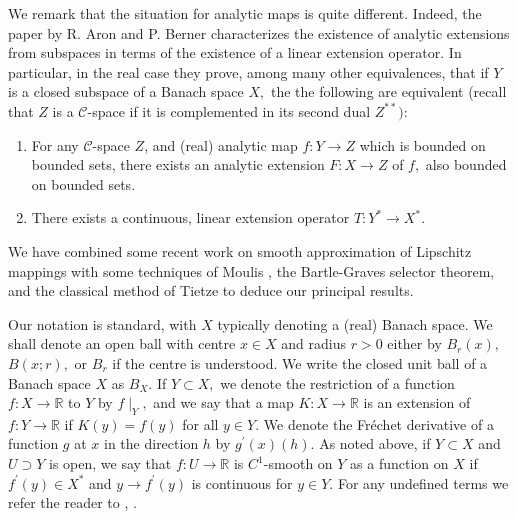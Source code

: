 \documentclass[11pt]{amsproc}%
\theoremstyle{plain}
\numberwithin{equation}{section}
\begin{document}
\smallskip

We remark that the situation for analytic maps is quite different. Indeed, the
paper by R. Aron and P. Berner \cite{AB} characterizes the existence of
analytic extensions from subspaces in terms of the existence of a linear
extension operator. In particular, in the real case they prove, among many
other equivalences, that if $Y$ is a closed subspace of a Banach space $X,$
the the following are equivalent (recall that $Z$ is a $\mathcal{C}$-space if
it is complemented in its second dual $Z^{\ast\ast})$:

\begin{enumerate}
\item For any $\mathcal{C}$-space $Z$, and (real) analytic map $f:Y\rightarrow
Z$ which is bounded on bounded sets, there exists an analytic extension
$F:X\rightarrow Z$ of $f,$ also bounded on bounded sets.

\item There exists a continuous, linear extension operator $T:Y^{\ast
}\rightarrow X^{\ast}.$
\end{enumerate}

\medskip

We have combined some recent work on smooth approximation of Lipschitz
mappings \cite{F} with some techniques of Moulis \cite{M}, the Bartle-Graves
selector theorem, and the classical method of Tietze to deduce our principal results.

\medskip

Our notation is standard, with $X$ typically denoting a (real) Banach space.
We shall denote an open ball with centre $x\in X$ and radius $r>0$ either by
$B_{r}\left(  x\right)  ,$ $B\left(  x;r\right)  ,$ or $B_{r}$ if the centre
is understood. We write the closed unit ball of a Banach space $X$ as $B_{X}.$
If $Y\subset X,$ we denote the restriction of a function $f:X\rightarrow
\mathbb{R}$ to $Y$ by $f\mid_{Y},$ and we say that a map $K:X\rightarrow
\mathbb{R}$ is an extension of $f:Y\rightarrow\mathbb{R}$ if $K\left(
y\right)  =f\left(  y\right)  $ for all $y\in Y.$ We denote the Fr{{\'e}}chet
derivative of a function $g$ at $x$ in the direction $h$ by $g^{\prime}\left(
x\right)  \left(  h\right)  .$ As noted above, if $Y\subset X$ and $U\supset
Y$ is open, we say that $f:U\rightarrow\mathbb{R}$ is $C^{1}$-smooth on $Y$ as
a function on $X$ if $f^{\prime}\left(  y\right)  \in X^{\ast}$ and
$y\rightarrow f^{\prime}\left(  y\right)  $ is continuous for $y\in Y.$ For
any undefined terms we refer the reader to \cite{FHHMPZ}, \cite{DGZ}.
\end{document}
